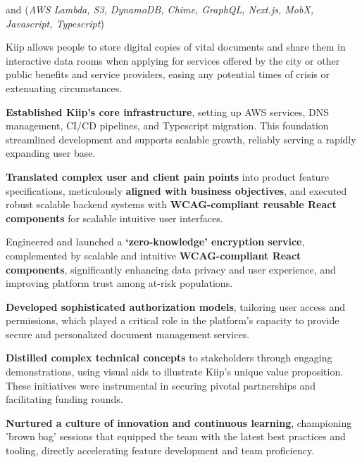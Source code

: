 \begin{cventries}
  \cvcustombodydescription
    { and  (\emph{AWS Lambda, S3, DynamoDB, Chime, GraphQL, Next.js, MobX, Javascript, Typescript})}
    {
      \begin{cvtightprose} %
        {Kiip allows people to store digital copies of vital documents and share them in interactive data rooms when applying for services offered by the city or other public benefits and service providers, easing any potential times of crisis or extenuating circumstances.}
      \end{cvtightprose}
    }
    {
      \begin{cvitems} %
        \item {\textbf{Established Kiip's core infrastructure}, setting up AWS services, DNS management, CI/CD pipelines, and Typescript migration. This foundation streamlined development and supports scalable growth, reliably serving a rapidly expanding user base.}
        \item{\textbf{Translated complex user and client pain points} into product feature specifications, meticulously \textbf{aligned with business objectives}, and executed robust scalable backend systems with \textbf{WCAG-compliant reusable React components} for scalable intuitive user interfaces.}
        \item{Engineered and launched a \textbf{`zero-knowledge' encryption service}, complemented by scalable and intuitive \textbf{WCAG-compliant React components}, significantly enhancing data privacy and user experience, and improving platform trust among at-risk populations.}
        \item{\textbf{Developed sophisticated authorization models}, tailoring user access and permissions, which played a critical role in the platform's capacity to provide secure and personalized document management services.}
        \item{\textbf{Distilled complex technical concepts} to stakeholders through engaging demonstrations, using visual aids to illustrate Kiip’s unique value proposition. These initiatives were instrumental in securing pivotal partnerships and facilitating funding rounds.}
        \item{\textbf{Nurtured a culture of innovation and continuous learning}, championing 'brown bag' sessions that equipped the team with the latest best practices and tooling, directly accelerating feature development and team proficiency.}
      \end{cvitems}
    }


\end{cventries}
